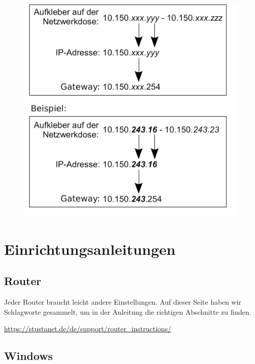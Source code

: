 \documentclass[a4paper,12pt]{scrartcl}
\begin{document}
\begin{figure}[h!]
		\centering
		\begin{minipage}[c]{0.4\linewidth}
			\centering
			\includegraphics[width=\linewidth,keepaspectratio]{Bilder/IP_Gerneric}
		\end{minipage}
	\end{figure}

\pagebreak

\section{Einrichtungsanleitungen}
\label{section_netzweradresse}
\subsection{Router}

Jeder Router braucht leicht andere Einstellungen.
Auf dieser Seite haben wir Schlagworte gesammelt, um in der Anleitung die richtigen Abschnitte zu finden.

\url{https://stustanet.de/de/support/router_instructions/}

\subsection{Windows}
\end{document}
